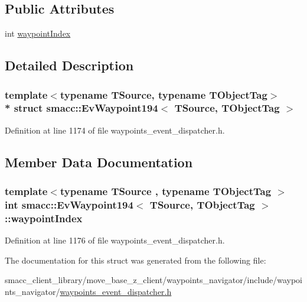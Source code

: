 \subsection*{Public Attributes}
\begin{DoxyCompactItemize}
\item 
int \hyperlink{structsmacc_1_1EvWaypoint194_af63f01a9adf35bbfc08facb1d412459d}{waypoint\+Index}
\end{DoxyCompactItemize}


\subsection{Detailed Description}
\subsubsection*{template$<$typename T\+Source, typename T\+Object\+Tag$>$\\*
struct smacc\+::\+Ev\+Waypoint194$<$ T\+Source, T\+Object\+Tag $>$}



Definition at line 1174 of file waypoints\+\_\+event\+\_\+dispatcher.\+h.



\subsection{Member Data Documentation}
\subsubsection[{\texorpdfstring{waypoint\+Index}{waypointIndex}}]{\setlength{\rightskip}{0pt plus 5cm}template$<$typename T\+Source , typename T\+Object\+Tag $>$ int {\bf smacc\+::\+Ev\+Waypoint194}$<$ T\+Source, T\+Object\+Tag $>$\+::waypoint\+Index}\hypertarget{structsmacc_1_1EvWaypoint194_af63f01a9adf35bbfc08facb1d412459d}{}\label{structsmacc_1_1EvWaypoint194_af63f01a9adf35bbfc08facb1d412459d}


Definition at line 1176 of file waypoints\+\_\+event\+\_\+dispatcher.\+h.



The documentation for this struct was generated from the following file\+:\begin{DoxyCompactItemize}
\item 
smacc\+\_\+client\+\_\+library/move\+\_\+base\+\_\+z\+\_\+client/waypoints\+\_\+navigator/include/waypoints\+\_\+navigator/\hyperlink{waypoints__event__dispatcher_8h}{waypoints\+\_\+event\+\_\+dispatcher.\+h}\end{DoxyCompactItemize}
